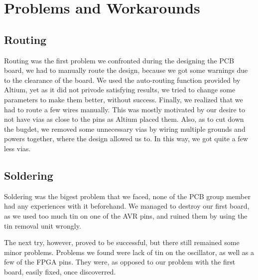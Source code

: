 \section {Problems and Workarounds}
\subsection{Routing}
Routing was the first problem we confronted during the designing the \ac{PCB}
board, we had to manually route the design, because we got some warnings due to
the clearance of the board. We used the auto-routing function provided by
Altium, yet as it did not privode satisfying results, we tried to change some
parameters to make them better, without success. Finally, we realized that we
had to route a few wires manually. This was mostly motivated by our desire to
not have vias as close to the pins as Altium placed them. Also, as to cut down
the bugdet, we removed some unnecessary vias by wiring multiple grounds and
powers together, where the design allowed us to. In this way, we got quite a few
less vias.
\subsection{Soldering}
Soldering was the bigest problem that we faced, none of the \ac{PCB} group
member had any experiences with it beforehand. We managed to destroy our first
board, as we used too much tin on one of the AVR pins, and ruined them by using
the tin removal unit wrongly.

The next try, however, proved to be successful, but there still remained some
minor problems. Problems we found were lack of tin on the oscillator, as well as
a few of the \ac{FPGA} pins. They were, as opposed to our problem with the first
board, easily fixed, once discoverred.



